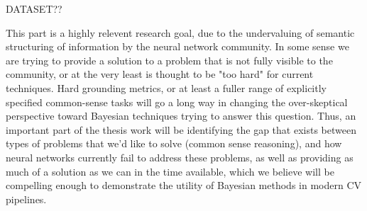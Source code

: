   DATASET??

  This part is a highly relevent research goal, due to the undervaluing of
  semantic structuring of information by the neural network community. In
  some sense we are trying to provide a solution to a problem that is not
  fully visible to the community, or at the very least is thought to be
  "too hard" for current techniques. Hard grounding metrics, or at least a
  fuller range of explicitly specified common-sense tasks will go a long
  way in changing the over-skeptical perspective toward Bayesian techniques
  trying to answer this question. Thus, an important part of the thesis
  work will be identifying the gap that exists between types of problems
  that we'd like to solve (common sense reasoning), and how neural networks
  currently fail to address these problems, as well as providing as much of
  a solution as we can in the time available, which we believe will be
  compelling enough to demonstrate the utility of Bayesian methods in
  modern CV pipelines.
